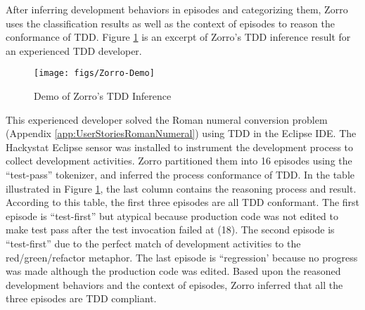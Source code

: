 After inferring development behaviors in episodes and categorizing them, Zorro uses the classification results as well as the context of episodes to reason the conformance of TDD. Figure \ref{fig:Zorro-Demo} is an excerpt of Zorro's TDD inference result for an experienced TDD developer. 
\begin{figure}[htbp]
  \centering
  \texttt{[image: figs/Zorro-Demo]}
  \caption{Demo of Zorro's TDD Inference}
  \label{fig:Zorro-Demo}
\end{figure}
This experienced developer solved the Roman numeral conversion problem (Appendix \ref{app:UserStoriesRomanNumeral}) using TDD in the Eclipse IDE. The Hackystat Eclipse sensor was installed to instrument the development process to collect development activities. Zorro partitioned them into 16 episodes using the ``test-pass'' tokenizer, and inferred the process conformance of TDD.  In the table illustrated in Figure \ref{fig:Zorro-Demo}, the last column  contains the reasoning process and result. According to this table, the first three episodes are all TDD conformant. The first episode is ``test-first'' but atypical because production code was not edited to make test pass after the test invocation failed at (18). The second episode is ``test-first'' due to the perfect match of development activities to the red/green/refactor metaphor. The last episode is ``regression' because no progress was made although the production code was edited. Based upon the reasoned development behaviors and the context of episodes, Zorro inferred that all the three episodes are TDD compliant. 

